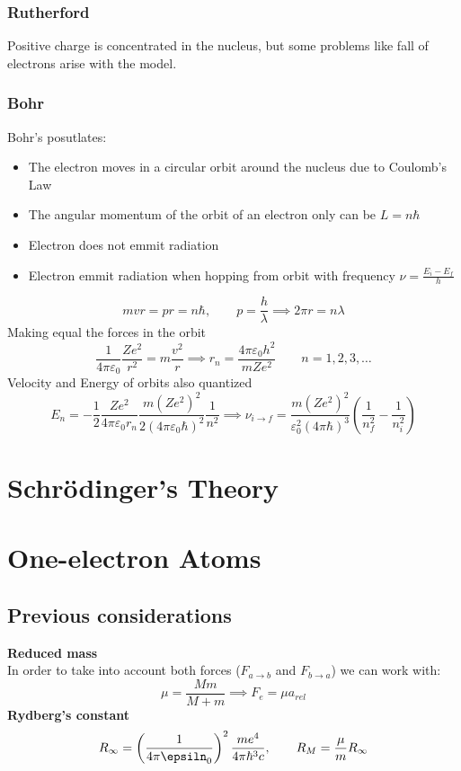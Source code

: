 \documentclass{myclass}
\begin{document}
\subsubsection{Rutherford}
Positive charge is concentrated in the nucleus, but some problems like fall of electrons arise with the model.

\subsubsection{Bohr}
Bohr's posutlates:
\begin{itemize}
    \item The electron moves in a circular orbit around the nucleus due to Coulomb's Law
    \item The angular momentum of the orbit of an electron only can be $L=n\hbar$
    \item Electron does not emmit radiation
    \item Electron emmit radiation when hopping from orbit with frequency $\nu = \frac{E_i-E_f}{h}$
\end{itemize}
$$
mvr = pr = n\hbar, \qquad p = \frac{h}{\lambda} \implies 2\pi \boxed{r=n\lambda}
$$
Making equal the forces in the orbit
$$
\frac{1}{4\pi\varepsilon_0}\frac{Ze^2}{r^2}=m\frac{v^2}{r} \implies \boxed{r_n = \frac{4\pi \varepsilon_0h^2}{mZe^2} \qquad n=1, 2, 3, \ldots}
$$
Velocity and Energy of orbits also quantized
$$
E_n = -\frac{1}{2} \frac{Ze^2}{4\pi \varepsilon_0r_n}
\frac{m(Ze^2)^2}{2(4\pi \varepsilon_0\hbar)^2}\frac{1}{n^2} 
\implies \boxed{\nu_{i\to f} = \frac{m(Ze^2)^2}{\varepsilon_0^2(4\pi \hbar)^3}\left(\frac{1}{n_f^2} - \frac{1}{n_i^2}\right)}
$$


\section{Schrödinger's Theory}

\section{One-electron Atoms}
\subsection{Previous considerations}
\textbf{Reduced mass}\\
In order to take into account both forces ($F_{a\to b}$ and $F_{b\to a}$) we can work with:
$$
\mu = \frac{Mm}{M+m} \implies F_e = \mu a_{rel}
$$
\textbf{Rydberg's constant}
$$
R_\infty = \left( \frac{1}{4\pi \epsiln_0}\right)^2\frac{me^4}{4\pi \hbar^3 c}, \qquad R_M = \frac{\mu}{m}R_\infty 
$$
\end{document}
